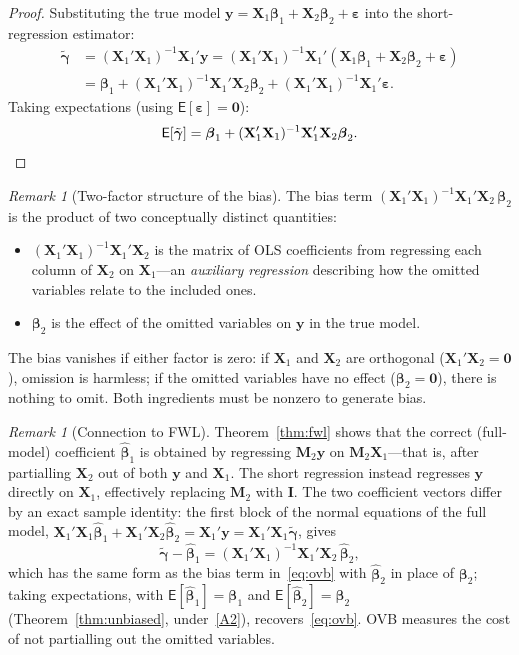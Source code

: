 \documentclass[14pt]{extarticle}
\theoremstyle{plain}
\theoremstyle{definition}
\theoremstyle{remark}
\newtheorem{remark}[theorem]{Remark}
\newcommand\expc{\mathsf{E}}
\newcommand{\bX}{\mathbf{X}}
\newcommand{\by}{\mathbf{y}}
\def\bb{\boldsymbol{\beta}}
\newcommand{\be}{\boldsymbol{\varepsilon}}
\newcommand{\bI}{\mathbf{I}}
\newcommand{\bM}{\mathbf{M}}
\newcommand{\bzero}{\mathbf{0}}
\begin{document}
\begin{proof}
Substituting the true model $\by = \bX_1\bb_1 + \bX_2\bb_2 + \be$ into the short-regression estimator:
\begin{align*}
\tilde{\boldsymbol\gamma} &= (\bX_1'\bX_1)^{-1}\bX_1'\by = (\bX_1'\bX_1)^{-1}\bX_1'(\bX_1\bb_1 + \bX_2\bb_2 + \be)\\
&= \bb_1 + (\bX_1'\bX_1)^{-1}\bX_1'\bX_2\bb_2 + (\bX_1'\bX_1)^{-1}\bX_1'\be.
\end{align*}
Taking expectations (using $\expc[\be] = \bzero$):
\[
\expc[\tilde{\boldsymbol\gamma}] = \bb_1 + (\bX_1'\bX_1)^{-1}\bX_1'\bX_2\bb_2. \qedhere
\]
\end{proof}

\begin{remark}[Two-factor structure of the bias]\label{rem:ovb-structure}
The bias term $(\bX_1'\bX_1)^{-1}\bX_1'\bX_2\,\bb_2$ is the product of two conceptually distinct quantities:
\begin{itemize}
\item $(\bX_1'\bX_1)^{-1}\bX_1'\bX_2$ is the matrix of OLS coefficients from regressing each column of $\bX_2$ on $\bX_1$---an \emph{auxiliary regression} describing how the omitted variables relate to the included ones.
\item $\bb_2$ is the effect of the omitted variables on $\by$ in the true model.
\end{itemize}
The bias vanishes if either factor is zero: if $\bX_1$ and $\bX_2$ are orthogonal ($\bX_1'\bX_2 = \bzero$), omission is harmless; if the omitted variables have no effect ($\bb_2 = \bzero$), there is nothing to omit. Both ingredients must be nonzero to generate bias.
\end{remark}

\begin{remark}[Connection to FWL]\label{rem:ovb-fwl}
Theorem~\ref{thm:fwl} shows that the correct (full-model) coefficient $\hat{\bb}_1$ is obtained by regressing $\bM_2\by$ on $\bM_2\bX_1$---that is, after partialling $\bX_2$ out of both $\by$ and $\bX_1$. The short regression instead regresses $\by$ directly on $\bX_1$, effectively replacing $\bM_2$ with $\bI$. The two coefficient vectors differ by an exact sample identity: the first block of the normal equations of the full model, $\bX_1'\bX_1\hat{\bb}_1 + \bX_1'\bX_2\hat{\bb}_2 = \bX_1'\by = \bX_1'\bX_1\tilde{\boldsymbol\gamma}$, gives
\[
\tilde{\boldsymbol\gamma} - \hat{\bb}_1 = (\bX_1'\bX_1)^{-1}\bX_1'\bX_2\,\hat{\bb}_2,
\]
which has the same form as the bias term in~\eqref{eq:ovb} with $\hat{\bb}_2$ in place of $\bb_2$; taking expectations, with $\expc[\hat{\bb}_1] = \bb_1$ and $\expc[\hat{\bb}_2] = \bb_2$ (Theorem~\ref{thm:unbiased}, under~\ref{A2}), recovers~\eqref{eq:ovb}. OVB measures the cost of not partialling out the omitted variables.
\end{remark}
\end{document}
